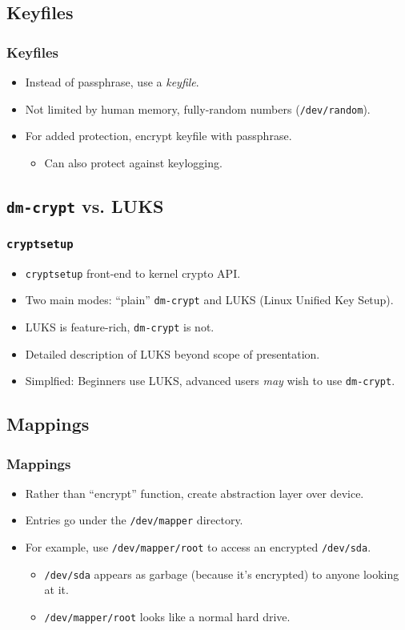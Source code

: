 \documentclass[xcolor={dvipsnames,svgnames},hyperref=dvips]{beamer}
\begin{document}
	\subsection{Keyfiles}
	\begin{frame}
		\frametitle{Keyfiles}
		\begin{itemize}
		\item Instead of passphrase, use a \textit{keyfile}.
		\item Not limited by human memory, fully-random numbers (\texttt{/dev/random}).
		\item For added protection, encrypt keyfile with passphrase.
			\begin{itemize}
			\item Can also protect against keylogging.
			\end{itemize}
		\end{itemize}
	\end{frame}

	\subsection{\texttt{dm-crypt} vs. LUKS}
	\begin{frame}
		\frametitle{\texttt{cryptsetup}}
		\begin{itemize}
		\item \texttt{cryptsetup} front-end to kernel crypto API.
		\item Two main modes: ``plain'' \texttt{dm-crypt} and LUKS (Linux Unified Key Setup).
		\item LUKS is feature-rich, \texttt{dm-crypt} is not.
		\item Detailed description of LUKS beyond scope of presentation.
		\item Simplfied: Beginners use LUKS, advanced users \textit{may} wish to use \texttt{dm-crypt}.
		\end{itemize}
	\end{frame}

	\subsection{Mappings}
	\begin{frame}
		\frametitle{Mappings}
		\begin{itemize}
		\item Rather than ``encrypt'' function, create abstraction layer over device.
		\item Entries go under the \texttt{/dev/mapper} directory.
		\item For example, use \texttt{/dev/mapper/root} to access an encrypted \texttt{/dev/sda}.
			\begin{itemize}
			\item \texttt{/dev/sda} appears as garbage (because it's encrypted) to anyone looking at it.
			\item \texttt{/dev/mapper/root} looks like a normal hard drive.
			\end{itemize}
		\end{itemize}
	\end{frame}
\end{document}
